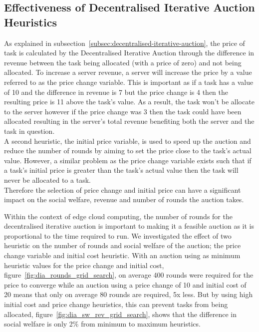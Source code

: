 \subsection{Effectiveness of Decentralised Iterative Auction Heuristics}
\label{subsec:effectiveness-of-decentralised-iterative-auction-heuristics}
As explained in subsection~\ref{subsec:decentralised-iterative-auction}, the price of task is calculated by the
Decentralised Iterative Auction through the difference in revenue between the task being allocated (with a price of
zero) and not being allocated. To increase a server revenue, a server will increase the price by a value referred to as
the price change variable. This is important as if a task has a value of 10 and the difference in revenue is 7 but the
price change is 4 then the resulting price is 11 above the task's value. As a result, the task won't be allocate to the
server however if the price change was 3 then the task could have been allocated resulting in the server's total
revenue benefiting both the server and the task in question. \\
A second heuristic, the initial price variable, is used to speed up the auction and reduce the number of rounds by
aiming to set the price close to the task's actual value. However, a similar problem as the price change variable exists
such that if a task's initial price is greater than the task's actual value then the task will never be allocated to a
task. \\
Therefore the selection of price change and initial price can have a significant impact on the social welfare, revenue
and number of rounds the auction takes.

Within the context of edge cloud computing, the number of rounds for the decentralised iterative auction is important
to making it a feasible auction as it is proportional to the time required to run. We investigated the effect of two
heuristic on the number of rounds and social welfare of the auction; the price change variable and initial cost
heuristic. With an auction using as minimum heuristic values for the price change and initial cost,
figure~\ref{fig:dia_rounds_grid_search}, on average 400 rounds were required for the price to converge while an auction
using a price change of 10 and initial cost of 20 means that only on average 80 rounds are required, 5x less. But by
using high initial cost and price change heuristics, this can prevent tasks from being allocated,
figure~\ref{fig:dia_sw_rev_grid_search}, shows that the difference in social welfare is only 2\% from minimum to
maximum heuristics.

